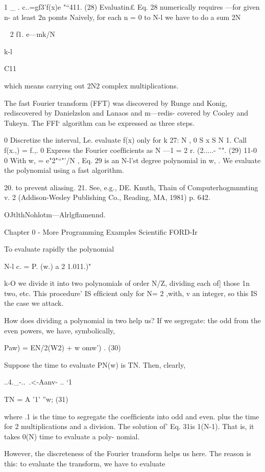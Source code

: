 {{{{{{{{1 _ .
c..=gf3'f(x)e "“411. (28)
Evaluatin£ Eq. 28 numerically requires —for given n- at least
2n pomts Naively, for each n = 0 to N-l we have to do a sum
2N

~ 2 f1. e—mk/N

k-l

C11

which means carrying out 2N2 complex multiplications.

The fast Fourier transform (FFT) was discovered by Runge and
Konig, rediscovered by Danielzslon and Lanaos and m—redis-
covered by Cooley and Tukeyn. The FFI‘ algorithm can be
expressed as three steps.

0 Discretize the interval, Le. evaluate f(x) only for
k
27: N , 0 S x S N 1.
Call f(x.,) = f.,.
0 Express the Fourier coefﬁcients as
N —1
= 2 r. (2.....- ”". (29)
11-0
0 With w, = e"2"“"'/N , Eq. 29 is an N-l’st degree polynomial in
w, . We evaluate the polynomial using a fast algorithm.

 

20. to prevent aliasing.
21. See, e.g., DE. Knuth, Thain of Computerhogmnmting v. 2 (Addison-Wesley Publishing Co.,
Reading, MA, 1981) p. 642.

OJtlthNohlotm—Alrlgﬂamennd.

Chapter 0 - More Programming Examples Scientific FORD-Ir

To evaluate rapidly the polynomial

N-l
c. = P. (w.) a 2 1.011.)"

k-O
we divide it into two polynomials of order N/Z, dividing each of]
those 1n two, etc. This procedure' IS efﬁcient only for N= 2 ,with,
v an integer, so this IS the case we attack.

How does dividing a polynomial in two help us? If we segregate:
the odd from the even powers, we have, symbolically,

Paw) = EN/2(W2) + w omw’) . (30)

 

Suppose the time to evaluate PN(w) is TN. Then, clearly,

..4._-..~.<-Aanv- .. ‘1

TN = A '1' ”w; (31)

where .1 is the time to segregate the coefﬁcients into odd and even.
plus the time for 2 multiplications and a division. The solution of’
Eq. 31is 1(N-1). That is, it takes 0(N) time to evaluate a poly-
nomial.

However, the discreteness of the Fourier transform helps us here.
The reason is this: to evaluate the transform, we have to evaluate

}}}}}}}}
